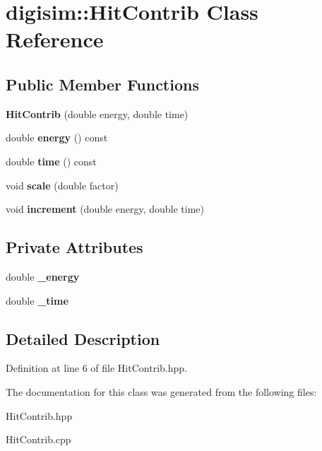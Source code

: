 \section{digisim\-:\-:Hit\-Contrib Class Reference}
\label{classdigisim_1_1HitContrib}
\subsection*{Public Member Functions}
\begin{DoxyCompactItemize}
\item 
{\bfseries Hit\-Contrib} (double energy, double time)\label{classdigisim_1_1HitContrib_a7244bc624861aa524c78e73cf7e0aba8}

\item 
double {\bfseries energy} () const \label{classdigisim_1_1HitContrib_a62ccf479e2c6f9066b0a53fc3dc87db2}

\item 
double {\bfseries time} () const \label{classdigisim_1_1HitContrib_af7da03bdadde1b872b26d843ece7d077}

\item 
void {\bfseries scale} (double factor)\label{classdigisim_1_1HitContrib_a934eee555d6d93abd79cb945307e78a4}

\item 
void {\bfseries increment} (double energy, double time)\label{classdigisim_1_1HitContrib_a0d9be0f90a021e9d6f979d9d2c2b48d4}

\end{DoxyCompactItemize}
\subsection*{Private Attributes}
\begin{DoxyCompactItemize}
\item 
double {\bfseries \-\_\-energy}\label{classdigisim_1_1HitContrib_aaf384d2e5576cfa2c6f90b862da13023}

\item 
double {\bfseries \-\_\-time}\label{classdigisim_1_1HitContrib_a98d7fc48134364bb4a2e8ebc2d603eed}

\end{DoxyCompactItemize}


\subsection{Detailed Description}


Definition at line 6 of file Hit\-Contrib.\-hpp.



The documentation for this class was generated from the following files\-:\begin{DoxyCompactItemize}
\item 
Hit\-Contrib.\-hpp\item 
Hit\-Contrib.\-cpp\end{DoxyCompactItemize}
